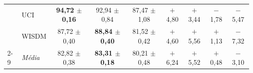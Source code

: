 \documentclass[border=8pt,varwidth=\maxdimen]{standalone}
\begin{document}
\begin{tabular}{llccccccc}
 & UCI             & \textbf{94{,}72 $\pm$ 0{,}16} & 92{,}94 $\pm$ 0{,}84 & 87{,}47 $\pm$ 1{,}08 & $+$4{,}80 & $+$3{,}44 & $-$1{,}78 & $-$5{,}47\\
 & WISDM           & 87{,}72 $\pm$ 0{,}40 & \textbf{88{,}84 $\pm$ 0{,}40} & 81{,}52 $\pm$ 0{,}42 & $+$4{,}60 & $+$5{,}56 & $+$1{,}13 & $-$7{,}32\\
\cmidrule(lr){2-9}
 & \textit{Média}    & 82{,}82 $\pm$ 0{,}38 & \textbf{83{,}31 $\pm$ 0{,}18} & 80{,}21 $\pm$ 0{,}48 & $+$6{,}24 & $+$5{,}52 & $+$0{,}48 & $-$3{,}10\\
\bottomrule
\end{tabular}
\end{document}
